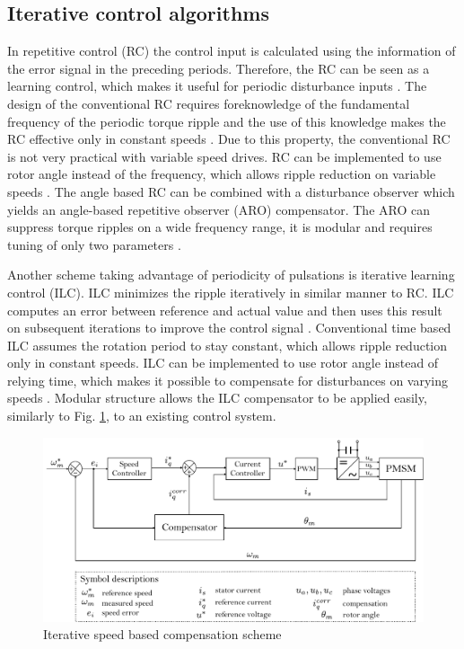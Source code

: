 \subsection{Iterative control algorithms}
In repetitive control (RC) the control input is calculated using the information of the error signal in the preceding periods. Therefore, the RC can be seen as a learning control, which makes it useful for periodic disturbance inputs \cite{RC:1988}. The design of the conventional RC requires foreknowledge of the fundamental frequency of the periodic torque ripple and the use of this knowledge makes the RC effective only in constant speeds \cite{RC:2017}. Due to this property, the conventional RC is not very practical with variable speed drives. RC can be implemented to use rotor angle instead of the frequency, which allows ripple reduction on variable speeds \cite{RC:2017}. The angle based RC can be combined with a disturbance observer which yields an angle-based repetitive observer (ARO) compensator. The ARO can suppress torque ripples on a wide frequency range, it is modular and requires tuning of only two parameters \cite{TRR_SW:2019}.

Another scheme taking advantage of periodicity of pulsations is iterative learning control (ILC). ILC minimizes the ripple iteratively in similar manner to RC. ILC computes an error between reference and actual value and then uses this result on subsequent iterations to improve the control signal \cite{ILC:2004, ILC:2005, ILC:2018}. Conventional time based ILC assumes the rotation period to stay constant, which allows ripple reduction only in constant speeds. ILC can be implemented to use rotor angle instead of relying time, which makes it possible to compensate for disturbances on varying speeds \cite{ILC:2012}. Modular structure allows the ILC compensator to be applied easily, similarly to Fig. \ref{Compensator_control_diag}, to an existing control system.
\begin{figure}[ht] 
    \centering
    \includegraphics[width=1.0\linewidth]{images/compensator.pdf} 
    \caption{Iterative speed based compensation scheme}
    \label{Compensator_control_diag} 
\end{figure}

